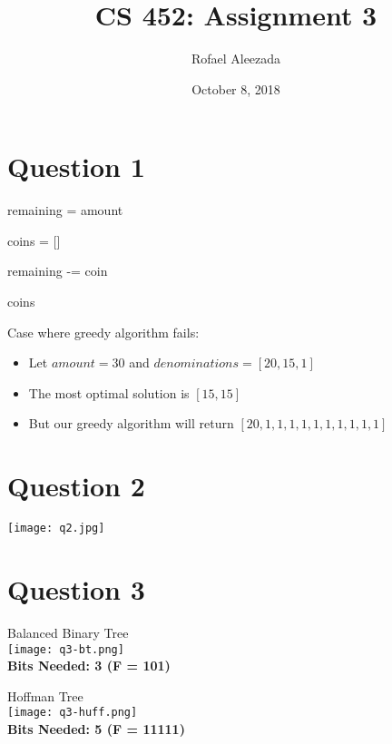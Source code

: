 \documentclass{article}
\title{CS 452: Assignment 3}
\date{October 8, 2018}
\author{Rofael Aleezada}
\begin{document}
	\maketitle
	
	\section{Question 1}
	\begin{algorithmic}
			
			
			remaining = amount
			
			coins = []
			
					\State {}
				\EndIf
						\State {} 
						\State remaining -= coin
					\EndIf
				\EndFor
			\EndWhile
			
			\Return coins
		\EndFunction
	\end{algorithmic}

	Case where greedy algorithm fails:
	\begin{itemize}
		\item Let $amount = 30$ and $denominations = [20, 15, 1]$
		\item The most optimal solution is $[15, 15]$
		\item But our greedy algorithm will return $[20, 1, 1, 1, 1, 1, 1, 1, 1, 1, 1]$
	\end{itemize}

	\section{Question 2}
	\texttt{[image: q2.jpg]}
	\pagebreak
	
	\section{Question 3}
	\begin{center}
		Balanced Binary Tree \\ 
		\texttt{[image: q3-bt.png]} \\
		\textbf{Bits Needed: 3 (F = 101)}
	\end{center}
	\begin{center}
		Hoffman Tree \\
		\texttt{[image: q3-huff.png]} \\
		\textbf{Bits Needed: 5 (F = 11111)}
	\end{center}
	\pagebreak
	
\end{document}
